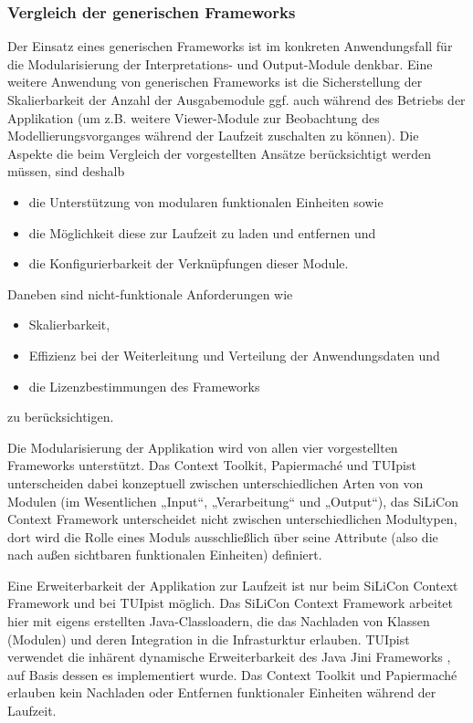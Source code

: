 
\subsubsection{Vergleich der generischen Frameworks}\label{subs:vergleich_generische_frameworks}

Der Einsatz eines generischen Frameworks ist im konkreten Anwendungsfall für die Modularisierung der Interpretations- und Output-Module denkbar. Eine weitere Anwendung von generischen Frameworks ist die Sicherstellung der Skalierbarkeit der Anzahl der Ausgabemodule ggf. auch während des Betriebs der Applikation (um z.B. weitere Viewer-Module zur Beobachtung des Modellierungsvorganges während der Laufzeit zuschalten zu können). Die Aspekte die beim Vergleich der vorgestellten Ansätze berücksichtigt werden müssen, sind deshalb
\begin{itemize}
  	\item die Unterstützung von modularen funktionalen Einheiten sowie
	\item die Möglichkeit diese zur Laufzeit zu laden und entfernen und
	\item die Konfigurierbarkeit der Verknüpfungen dieser Module.
\end{itemize}  
Daneben sind nicht-funktionale Anforderungen wie 
\begin{itemize}
	\item Skalierbarkeit,
	\item Effizienz bei der Weiterleitung und Verteilung der Anwendungsdaten und  
	\item die Lizenzbestimmungen des Frameworks
\end{itemize}  
zu berücksichtigen.

Die Modularisierung der Applikation wird von allen vier vorgestellten Frameworks unterstützt. Das Context Toolkit, Papiermaché und TUIpist unterscheiden dabei konzeptuell zwischen unterschiedlichen Arten von von Modulen (im Wesentlichen „Input“, „Verarbeitung“ und „Output“), das SiLiCon Context Framework unterscheidet nicht zwischen unterschiedlichen Modultypen, dort wird die Rolle eines Moduls ausschließlich über seine Attribute (also die nach außen sichtbaren funktionalen Einheiten) definiert. 

Eine Erweiterbarkeit der Applikation zur Laufzeit ist nur beim SiLiCon Context Framework und bei TUIpist möglich. Das SiLiCon Context Framework arbeitet hier mit eigens erstellten Java-Classloadern, die das Nachladen von Klassen (Modulen) und deren Integration in die Infrasturktur erlauben. TUIpist verwendet die inhärent dynamische Erweiterbarkeit des Java Jini Frameworks \citep{Arnold99}, auf Basis dessen es implementiert wurde. Das Context Toolkit und Papiermaché erlauben kein Nachladen oder Entfernen funktionaler Einheiten während der Laufzeit.

